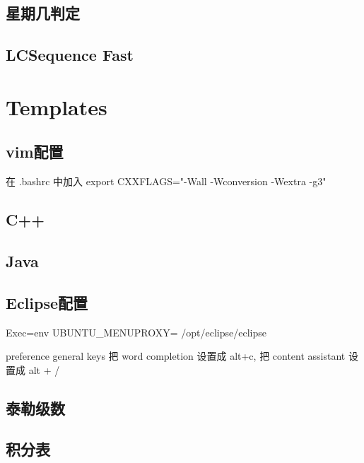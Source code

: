 \documentclass[landscape, twocolumn, 8pt, a4paper, twoside]{extarticle}
\begin{document}
  \subsection{星期几判定}
    

  \subsection{LCSequence Fast}
    

\section{Templates}
  \subsection{vim配置}
    在 .bashrc 中加入 export CXXFLAGS="-Wall -Wconversion -Wextra -g3"
    
  \subsection{C++}
    
  \subsection{Java}
    
  \subsection{Eclipse配置}
    Exec=env UBUNTU\_MENUPROXY= /opt/eclipse/eclipse

    preference general keys 把 word completion 设置成 alt+c, 把 content assistant 设置成 alt + /
  \subsection{泰勒级数}
    
  \subsection{积分表}
    
\end{document}
